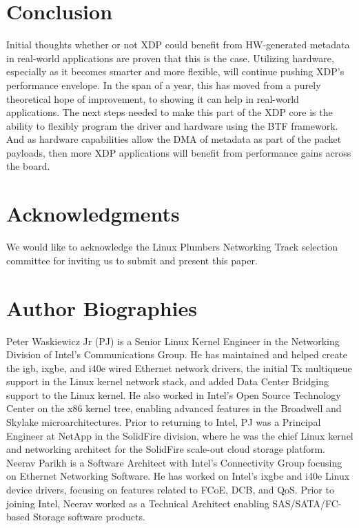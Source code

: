 \documentclass[letterpaper]{article}
\begin{document}
\section{Conclusion}
Initial thoughts whether or not XDP could benefit from HW-generated metadata in real-world applications are proven that this is the case.  Utilizing hardware, especially as it becomes smarter and more flexible, will continue pushing XDP’s performance envelope.  In the span of a year, this has moved from a purely theoretical hope of improvement, to showing it can help in real-world applications.  The next steps needed to make this part of the XDP core is the ability to flexibly program the driver and hardware using the BTF framework.  And as hardware capabilities allow the DMA of metadata as part of the packet payloads, then more XDP applications will benefit from performance gains across the board.

\section{Acknowledgments}
We would like to acknowledge the Linux Plumbers Networking Track selection committee for inviting us to submit and present this paper.




\section{Author Biographies}
Peter Waskiewicz Jr (PJ) is a Senior Linux Kernel Engineer in the Networking Division of Intel's Communications Group. He has maintained and helped create the igb, ixgbe, and i40e wired Ethernet network drivers, the initial Tx multiqueue support in the Linux kernel network stack, and added Data Center Bridging support to the Linux kernel. He also worked in Intel's Open Source Technology Center on the x86 kernel tree, enabling advanced features in the Broadwell and Skylake microarchitectures. Prior to returning to Intel, PJ was a Principal Engineer at NetApp in the SolidFire division, where he was the chief Linux kernel and networking architect for the SolidFire scale-out cloud storage platform.
\newline
\newline
Neerav Parikh is a Software Architect with Intel's Connectivity Group focusing on Ethernet Networking Software. He has worked on Intel's ixgbe and i40e Linux device drivers, focusing on features related to FCoE, DCB, and QoS. Prior to joining Intel, Neerav worked as a Technical Architect enabling SAS/SATA/FC-based Storage software products.
\end{document}
